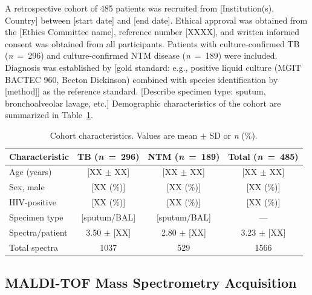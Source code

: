 \documentclass[journal=ancham, manuscript=article, layout=traditional]{achemso}
\begin{document}
A retrospective cohort of 485 patients was recruited from
[Institution(s), Country] between [start date] and [end date].
Ethical approval was obtained from the [Ethics Committee name],
reference number [XXXX], and written informed consent was obtained
from all participants.
Patients with culture-confirmed TB (\textit{n}~=~296) and
culture-confirmed NTM disease (\textit{n}~=~189) were included.
Diagnosis was established by [gold standard: e.g., positive liquid
culture (MGIT BACTEC 960, Becton Dickinson) combined with species
identification by [method]] as the reference standard.
[Describe specimen type: sputum, bronchoalveolar lavage, etc.]
Demographic characteristics of the cohort are summarized in
Table~\ref{tab:cohort}.


\begin{table}
  \caption{Cohort characteristics.
    Values are mean $\pm$ SD or \textit{n} (\%).}
  \label{tab:cohort}
  \begin{tabular}{lccc}
    \toprule
    Characteristic & TB (\textit{n}~=~296) & NTM (\textit{n}~=~189) &
      Total (\textit{n}~=~485) \\
    \midrule
    Age (years)       & [XX $\pm$ XX]  & [XX $\pm$ XX]  & [XX $\pm$ XX]  \\
    Sex, male         & [XX (\%)]      & [XX (\%)]      & [XX (\%)]      \\
    HIV-positive      & [XX (\%)]      & [XX (\%)]      & [XX (\%)]      \\
    Specimen type     & [sputum/BAL]   & [sputum/BAL]   & ---            \\
    Spectra/patient   & 3.50 $\pm$ [XX] & 2.80 $\pm$ [XX] & 3.23 $\pm$ [XX] \\
    Total spectra     & 1037           & 529            & 1566           \\
    \bottomrule
  \end{tabular}
\end{table}

\subsection{MALDI-TOF Mass Spectrometry Acquisition}

\end{document}
